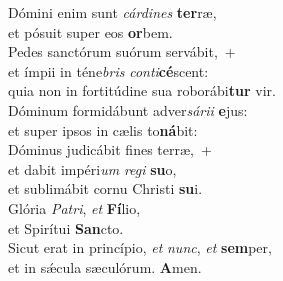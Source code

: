 \oddverse Dómini enim sunt \textit{cár}\textit{di}\textit{nes} \textbf{ter}ræ,~\*\\
\oddverse et pósuit super eos \textbf{or}bem.\\
\evenverse Pedes sanctórum suórum servábit,~+\\
\evenverse  et ímpii in téne\textit{bris} \textit{con}\textit{ti}\textbf{cé}scent:~\*\\
\evenverse quia non in fortitúdine sua roborábi\textbf{tur} vir.\\
\oddverse Dóminum formidábunt adver\textit{sá}\textit{ri}\textit{i} \textbf{e}jus:~\*\\
\oddverse et super ipsos in cælis to\textbf{ná}bit:\\
\evenverse Dóminus judicábit fines terræ,~+\\
\evenverse  et dabit impéri\textit{um} \textit{re}\textit{gi} \textbf{su}o,~\*\\
\evenverse et sublimábit cornu Christi \textbf{su}i.\\
\oddverse Glória \textit{Pa}\textit{tri}, \textit{et} \textbf{Fí}lio,~\*\\
\oddverse et Spirítui \textbf{San}cto.\\
\evenverse Sicut erat in princípio, \textit{et} \textit{nunc}, \textit{et} \textbf{sem}per,~\*\\
\evenverse et in sǽcula sæculórum. \textbf{A}men.\\

